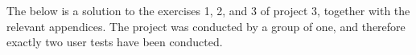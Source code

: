 \documentclass[a4paper]{article}
\begin{document}
\maketitle
\thispagestyle{first} %

\pagebreak

The below is a solution to the exercises 1, 2, and 3 of project 3, together
with the relevant appendices. The project was conducted by a group of one, and
therefore exactly two user tests have been conducted.

\tableofcontents









\appendix


\end{document}
